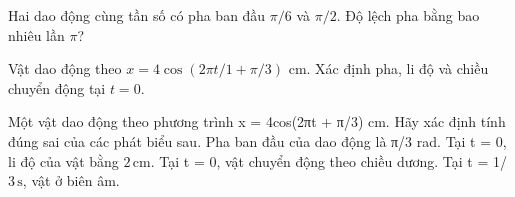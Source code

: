 \begin{ex}
Hai dao động cùng tần số có pha ban đầu $\pi/6$ và $\pi/2.$ Độ lệch pha bằng bao nhiêu lần $\pi$?
\end{ex}

\begin{ex}
Vật dao động theo $x=4\cos(2\pi t/1+\pi/3)$ cm. Xác định pha, li độ và chiều chuyển động tại $t=0$.
\choiceTF

\end{ex}

\begin{ex}
Một vật dao động theo phương trình x = 4cos(2πt + π/3) cm. Hãy xác định tính đúng sai của các phát biểu sau.
\choiceTF
{\True Pha ban đầu của dao động là π/3 rad.}
{\True Tại t = 0, li độ của vật bằng $2\,\text{cm}$.}
{Tại t = 0, vật chuyển động theo chiều dương.}
{\True Tại t = 1/ $3\,\text{s}$, vật ở biên âm.}
\end{ex}

